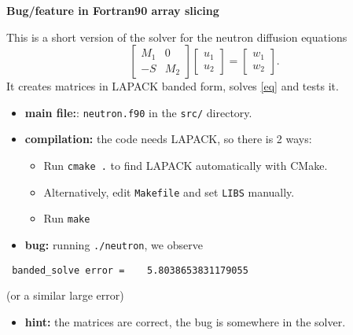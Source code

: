 \documentclass{slides}
\begin{document}
\begin{center}
{\large\bf Bug/feature in Fortran90 array slicing}
\end{center}


This is a short version of the solver for the neutron diffusion equations
\begin{equation}
\begin{bmatrix}
 M_1 & 0 \\
 -S  & M_2
\end{bmatrix}
\begin{bmatrix}
 u_1 \\
 u_2
\end{bmatrix} =
\begin{bmatrix}
 w_1 \\
 w_2
\end{bmatrix}.
\label{eq}
\end{equation}
It creates matrices in LAPACK banded form, solves \eqref{eq} and tests it.


\begin{itemize}
 \item \textbf{main file:}: \verb+neutron.f90+ in the \verb+src/+ directory.
 \vspace*{-3ex}
 \item \textbf{compilation:} the code needs LAPACK, so there is 2 ways:
 \begin{itemize}
 \vspace*{-2ex}
  \item Run \verb*+cmake .+ to find LAPACK automatically with CMake.
 \vspace*{-2ex}
  \item Alternatively, edit \verb+Makefile+ and set \verb+LIBS+ manually.
 \vspace*{-2ex}
  \item Run \verb+make+
 \end{itemize}
 \vspace*{-3ex}
 \item \textbf{bug:} running \verb+./neutron+, we observe
\end{itemize}
\vspace*{-3ex}
\begin{verbatim}
 banded_solve error =    5.8038653831179055
\end{verbatim}
\vspace*{-2ex}
(or a similar large error)

\vspace*{-2ex}
\begin{itemize}
 \item \textbf{hint:} the matrices are correct, the bug is somewhere in the solver.
\end{itemize}
\end{document}
